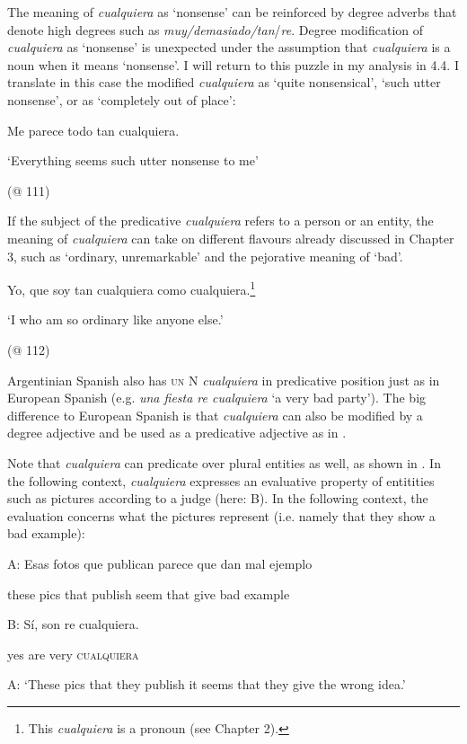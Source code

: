   The meaning of \textit{cualquiera} as ‘nonsense’ can be reinforced by degree adverbs that denote high degrees such as \textit{muy/demasiado/tan}/\textit{re}. Degree modification of \textit{cualquiera} as ‘nonsense’ is unexpected under the assumption that \textit{cualquiera} is a noun when it means ‘nonsense’. I will return to this puzzle in my analysis in 4.4. I translate in this case the modified \textit{cualquiera} as ‘quite nonsensical’, ‘such utter nonsense’, or as ‘completely out of place’:

    Me parece todo tan cualquiera.

‘Everything seems such utter nonsense to me’

(@ 111)

If the subject of the predicative \textit{cualquiera} refers to a person or an entity, the meaning of \textit{cualquiera} can take on different flavours already discussed in Chapter 3, such as ‘ordinary, unremarkable’ and the pejorative meaning of ‘bad’. 

    Yo, que soy tan cualquiera como cualquiera.\footnote{This \textit{cualquiera} is a pronoun (see Chapter 2).}

‘I who am so ordinary like anyone else.’

    (@ 112)

Argentinian Spanish also has \textsc{un} N \textit{cualquiera} in predicative position just as in European Spanish (e.g. \textit{una fiesta re cualquiera} ‘a very bad party’). The big difference to European Spanish is that \textit{cualquiera} can also be modified by a degree adjective and be used as a predicative adjective as in .

  Note that \textit{cualquiera} can predicate over plural entities as well, as shown in . In the following context, \textit{cualquiera} expresses an evaluative property of entitities such as pictures according to a judge (here: B). In the following context, the evaluation concerns what the pictures represent (i.e. namely that they show a bad example):

\label{bkm:Ref150786385}  A:  Esas  fotos  que  publican  parece  que  dan  mal  ejemplo

    these  pics  that  publish  seem  that  give  bad  example

  B:  Sí,  son  re  cualquiera.

    yes  are  very  \textsc{cualquiera}

  A: ‘These pics that they publish it seems that they give the wrong idea.’

